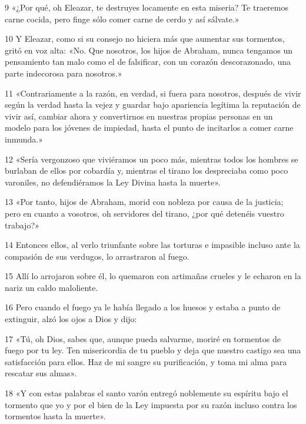 \par 9 «¿Por qué, oh Eleazar, te destruyes locamente en esta miseria? Te traeremos carne cocida, pero finge sólo comer carne de cerdo y así sálvate.»

\par 10 Y Eleazar, como si su consejo no hiciera más que aumentar sus tormentos, gritó en voz alta: «No. Que nosotros, los hijos de Abraham, nunca tengamos un pensamiento tan malo como el de falsificar, con un corazón descorazonado, una parte indecorosa para nosotros.»

\par 11 «Contrariamente a la razón, en verdad, si fuera para nosotros, después de vivir según la verdad hasta la vejez y guardar bajo apariencia legítima la reputación de vivir así, cambiar ahora y convertirnos en nuestras propias personas en un modelo para los jóvenes de impiedad, hasta el punto de incitarlos a comer carne inmunda.»

\par 12 «Sería vergonzoso que viviéramos un poco más, mientras todos los hombres se burlaban de ellos por cobardía y, mientras el tirano los despreciaba como poco varoniles, no defendiéramos la Ley Divina hasta la muerte».

\par 13 «Por tanto, hijos de Abraham, morid con nobleza por causa de la justicia; pero en cuanto a vosotros, oh servidores del tirano, ¿por qué detenéis vuestro trabajo?»

\par 14 Entonces ellos, al verlo triunfante sobre las torturas e impasible incluso ante la compasión de sus verdugos, lo arrastraron al fuego.

\par 15 Allí lo arrojaron sobre él, lo quemaron con artimañas crueles y le echaron en la nariz un caldo maloliente.

\par 16 Pero cuando el fuego ya le había llegado a los huesos y estaba a punto de extinguir, alzó los ojos a Dios y dijo:

\par 17 «Tú, oh Dios, sabes que, aunque pueda salvarme, moriré en tormentos de fuego por tu ley. Ten misericordia de tu pueblo y deja que nuestro castigo sea una satisfacción para ellos. Haz de mi sangre su purificación, y toma mi alma para rescatar sus almas».

\par 18 «Y con estas palabras el santo varón entregó noblemente su espíritu bajo el tormento que yo y por el bien de la Ley impuesta por su razón incluso contra los tormentos hasta la muerte».

